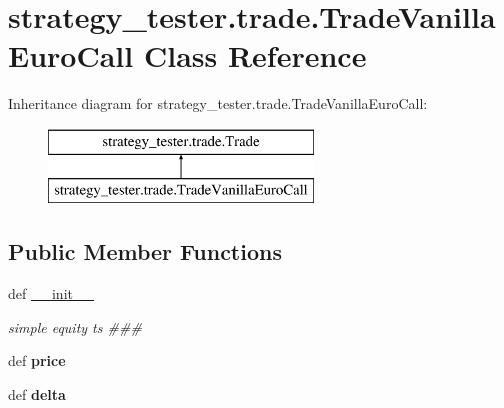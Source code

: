 \hypertarget{classstrategy__tester_1_1trade_1_1TradeVanillaEuroCall}{\section{strategy\-\_\-tester.\-trade.\-Trade\-Vanilla\-Euro\-Call \-Class \-Reference}
\label{classstrategy__tester_1_1trade_1_1TradeVanillaEuroCall}
}
\-Inheritance diagram for strategy\-\_\-tester.\-trade.\-Trade\-Vanilla\-Euro\-Call\-:\begin{figure}[H]
\begin{center}
\leavevmode
\includegraphics[height=2.000000cm]{classstrategy__tester_1_1trade_1_1TradeVanillaEuroCall}
\end{center}
\end{figure}
\subsection*{\-Public \-Member \-Functions}
\begin{DoxyCompactItemize}
\item 
\hypertarget{classstrategy__tester_1_1trade_1_1TradeVanillaEuroCall_a3dc52275b86c12cd7d410db114c7eb5e}{def \hyperlink{classstrategy__tester_1_1trade_1_1TradeVanillaEuroCall_a3dc52275b86c12cd7d410db114c7eb5e}{\-\_\-\-\_\-init\-\_\-\-\_\-}}\label{classstrategy__tester_1_1trade_1_1TradeVanillaEuroCall_a3dc52275b86c12cd7d410db114c7eb5e}

\begin{DoxyCompactList}\small\item\em simple equity ts \#\#\# \end{DoxyCompactList}\item 
\hypertarget{classstrategy__tester_1_1trade_1_1TradeVanillaEuroCall_a2f29713c10853cc51e603bb80f1dac0c}{def {\bfseries price}}\label{classstrategy__tester_1_1trade_1_1TradeVanillaEuroCall_a2f29713c10853cc51e603bb80f1dac0c}

\item 
\hypertarget{classstrategy__tester_1_1trade_1_1TradeVanillaEuroCall_a7017d62fb4dba7396cf5a3b303acc90e}{def {\bfseries delta}}\label{classstrategy__tester_1_1trade_1_1TradeVanillaEuroCall_a7017d62fb4dba7396cf5a3b303acc90e}

\end{DoxyCompactItemize}

